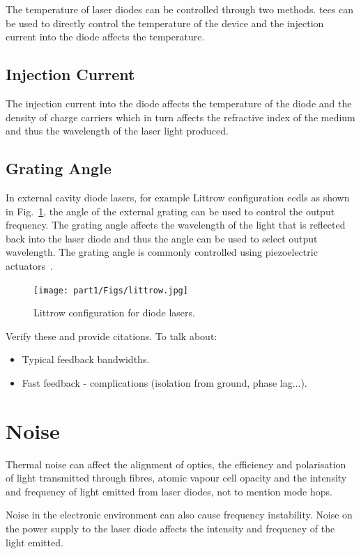 The temperature of laser diodes can be controlled through two methods. \Glspl{tec} can be used to directly control the temperature of the device and the injection current into the diode affects the temperature.

\subsection{Injection Current}
The injection current into the diode affects the temperature of the diode and the density of charge carriers which in turn affects the refractive index of the medium and thus the wavelength of the laser light produced.

\subsection{Grating Angle}
In external cavity diode lasers, for example Littrow configuration \glspl{ecdl} as shown in Fig.~\ref{figure:littrow}, the angle of the external grating can be used to control the output frequency.
The grating angle affects the wavelength of the light that is reflected back into the laser diode and thus the angle can be used to select output wavelength.
The grating angle is commonly controlled using piezoelectric actuators~\cite{hawthorn_littrow_2001}.

\begin{figure}
\texttt{[image: part1/Figs/littrow.jpg]}
\caption{Littrow configuration for diode lasers.}
\label{figure:littrow}
\end{figure}

{\color{red} Verify these and provide citations.}
To talk about:
\begin{itemize}
\item Typical feedback bandwidths.
\item Fast feedback - complications (isolation from ground, phase lag...).
\end{itemize}


\section{Noise}
Thermal noise can affect the alignment of optics, the efficiency and polarisation of light transmitted through fibres, atomic vapour cell opacity and the intensity and frequency of light emitted from laser diodes, not to mention mode hops.

Noise in the electronic environment can also cause frequency instability. Noise on the power supply to the laser diode affects the intensity and frequency of the light emitted.


